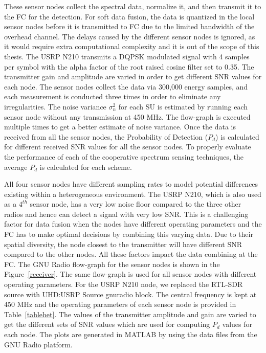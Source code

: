 These sensor nodes collect the spectral data, normalize it, and then transmit it to the FC for the detection. For soft data fusion, the data is quantized in the local sensor nodes before it is transmitted to FC due to the limited bandwidth of the overhead channel. The delays caused by the different sensor nodes is ignored, as it would require extra computational complexity and it is out of the scope of this thesis. The USRP N210 transmits a DQPSK modulated signal with 4 samples per symbol with the alpha factor of the root raised cosine filter set to 0.35. The transmitter gain and amplitude are varied in order to get different SNR values for each node. The sensor nodes collect the data via 300,000 energy samples, and each measurement is conducted three times in order to eliminate any irregularities. The noise variance $\sigma_n^2$ for each SU is estimated by running each sensor node without any transmission at 450 MHz. The flow-graph is executed multiple times to get a better estimate of noise variance. Once the data is received from all the sensor nodes, the Probability of Detection ($P_d$) is calculated for different received SNR values for all the sensor nodes. To properly evaluate the performance of each of the cooperative spectrum sensing techniques, the average $P_d$ is calculated for each scheme. 

All four sensor nodes have different sampling rates to model potential differences existing within a heterogeneous environment. The USRP N210, which is also used as a $4^{th}$ sensor node, has a very low noise floor compared to the three other radios and hence can detect a signal with very low SNR. This is a challenging factor for data fusion when the nodes have different operating parameters and the FC has to make optimal decisions by combining this varying data. Due to their spatial diversity, the node closest to the transmitter will have different SNR compared to the other nodes. All these factors impact the data combining at the FC. The GNU Radio flow-graph for the sensor nodes is shown in the Figure~\ref{receiver}. The same flow-graph is used for all sensor nodes with different operating parameters. For the USRP N210 node, we replaced the RTL-SDR source with UHD:USRP Source gnuradio block. The central frequency is kept at 450 MHz and the operating parameters of each sensor node is provided in Table~\ref{tablehet}. The values of the transmitter amplitude and gain are varied to get the different sets of SNR values which are used for computing $P_d$ values for each node. The plots are generated in MATLAB by using the data files from the GNU Radio platform.

